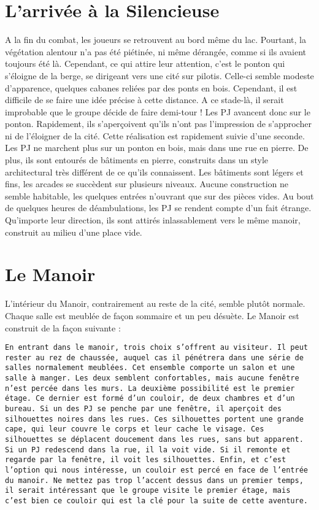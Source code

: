 \documentclass[a4paper, 11pt]{article}
\begin{document}
\section{L'arrivée à la Silencieuse}
A la fin du combat, les joueurs se retrouvent au bord même du lac. Pourtant, la végétation alentour n'a pas été piétinée, ni même dérangée, comme si ils avaient toujours été là. Cependant, ce qui attire leur attention, c'est le ponton qui s'éloigne de la berge, se dirigeant vers une cité sur pilotis. Celle-ci semble modeste d'apparence, quelques cabanes reliées par des ponts en bois. Cependant, il est difficile de se faire une idée précise à cette distance. 
\newline
A ce stade-là, il serait improbable que le groupe décide de faire demi-tour ! Les PJ avancent donc sur le ponton. Rapidement, ils s'aperçoivent qu'ils n'ont pas l'impression de s'approcher ni de l'éloigner de la cité. Cette réalisation est rapidement suivie d'une seconde. Les PJ ne marchent plus sur un ponton en bois, mais dans une rue en pierre. De plus, ils sont entourés de bâtiments en pierre, construits dans un style architectural très différent de ce qu'ils connaissent. Les bâtiments sont légers et fins, les arcades se succèdent sur plusieurs niveaux. Aucune construction ne semble habitable, les quelques entrées n'ouvrant que sur des pièces vides. Au bout de quelques heures de déambulations, les PJ se rendent compte d'un fait étrange. Qu'importe leur direction, ils sont attirés inlassablement vers le même manoir, construit au milieu d'une place vide.
\section{Le Manoir}
L'intérieur du Manoir, contrairement au reste de la cité, semble plutôt normale. Chaque salle est meublée de façon sommaire et un peu désuète. Le Manoir est construit de la façon suivante :
\begin{flushright}
\texttt{En entrant dans le manoir, trois choix s'offrent au visiteur. Il peut rester au rez de chaussée, auquel cas il pénétrera dans une série de salles normalement meublées. Cet ensemble comporte un salon et une salle à manger. Les deux semblent confortables, mais aucune fenêtre n'est percée dans les murs. 
\newline
La deuxième possibilité est le premier étage. Ce dernier est formé d'un couloir, de deux chambres et d'un bureau. Si un des PJ se penche par une fenêtre, il aperçoit des silhouettes noires dans les rues. Ces silhouettes portent une grande cape, qui leur couvre le corps et leur cache le visage. Ces silhouettes se déplacent doucement dans les rues, sans but apparent. Si un PJ redescend dans la rue, il la voit vide. Si il remonte et regarde par la fenêtre, il voit les silhouettes.
\newline
Enfin, et c'est l'option qui nous intéresse, un couloir est percé en face de l'entrée du manoir. Ne mettez pas trop l'accent dessus dans un premier temps, il serait intéressant que le groupe visite le premier étage, mais c'est bien ce couloir qui est la clé pour la suite de cette aventure.}
\end{flushright}
\end{document}
